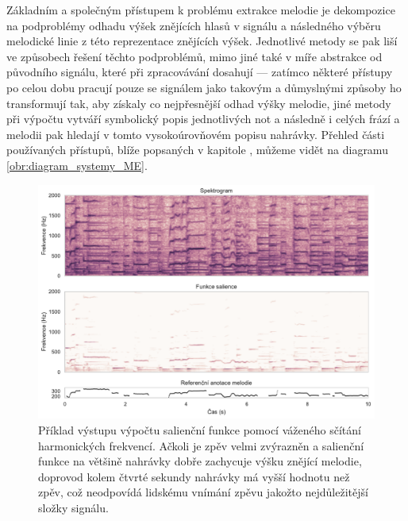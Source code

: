 Základním a společným přístupem k problému extrakce melodie je dekompozice na podproblémy odhadu výšek znějících hlasů v signálu a následného výběru melodické linie z této reprezentace znějících výšek. Jednotlivé metody se pak liší ve způsobech řešení těchto podproblémů, mimo jiné také v míře abstrakce od původního signálu, které při zpracovávání dosahují --- zatímco některé přístupy po celou dobu pracují pouze se signálem jako takovým a důmyslnými způsoby ho transformují tak, aby získaly co nejpřesnější odhad výšky melodie, jiné metody při výpočtu vytváří symbolický popis jednotlivých not a následně i celých frází a melodii pak hledají v tomto vysokoúrovňovém popisu nahrávky. Přehled části používaných přístupů, blíže popsaných v kapitole , můžeme vidět na diagramu \ref{obr:diagram_systemy_ME}.

\begin{figure}[h]\centering
\includegraphics[width=\textwidth,height=\textheight,keepaspectratio]{../img/salience}
\caption{Příklad výstupu výpočtu salienční funkce pomocí váženého sčítání harmonických frekvencí. Ačkoli je zpěv velmi zvýrazněn a salienční funkce na většině nahrávky dobře zachycuje výšku znějící melodie, doprovod kolem čtvrté sekundy nahrávky má vyšší hodnotu než zpěv, což neodpovídá lidskému vnímání zpěvu jakožto nejdůležitější složky signálu.}
\label{obr:salience}
\end{figure}

